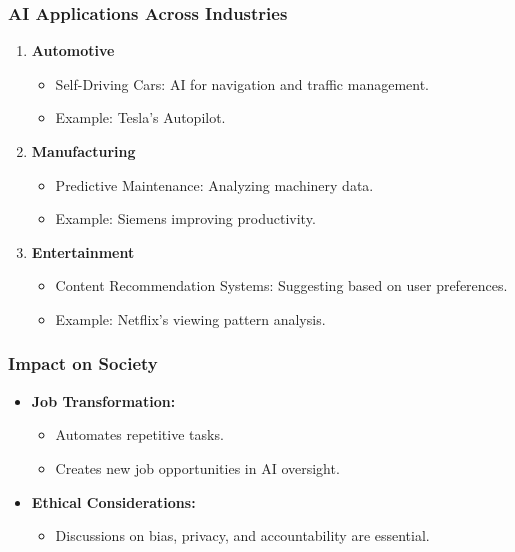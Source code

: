 \documentclass{beamer}
\begin{document}
\begin{frame}[fragile]
    \frametitle{AI Applications Across Industries}
    \begin{enumerate}
        \item \textbf{Automotive}
            \begin{itemize}
                \item Self-Driving Cars: AI for navigation and traffic management.
                \item Example: Tesla's Autopilot.
            \end{itemize}
        \item \textbf{Manufacturing}
            \begin{itemize}
                \item Predictive Maintenance: Analyzing machinery data.
                \item Example: Siemens improving productivity.
            \end{itemize}
        \item \textbf{Entertainment}
            \begin{itemize}
                \item Content Recommendation Systems: Suggesting based on user preferences.
                \item Example: Netflix’s viewing pattern analysis.
            \end{itemize}
    \end{enumerate}
\end{frame}

\begin{frame}[fragile]
    \frametitle{Impact on Society}
    \begin{itemize}
        \item \textbf{Job Transformation:} 
            \begin{itemize}
                \item Automates repetitive tasks.
                \item Creates new job opportunities in AI oversight.
            \end{itemize}
        \item \textbf{Ethical Considerations:} 
            \begin{itemize}
                \item Discussions on bias, privacy, and accountability are essential.
            \end{itemize}
    \end{itemize}
\end{frame}
\end{document}
